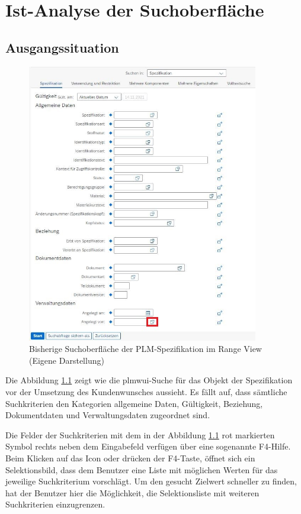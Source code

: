 \chapter{Ist-Analyse der Suchoberfläche}

\section{Ausgangssituation}

\begin{figure}[htbp]
    \centering
    \includegraphics[width=0.9\textwidth]{img/LayoutRdavormitMarkierung.jpg}
    \caption[Bisherige Suchoberfläche der PLM-Spezifikation im Range View]{Bisherige Suchoberfläche der PLM-Spezifikation im Range View (Eigene Darstellung)}
    \label{fig:LayoutRdavor}
\end{figure}

Die Abbildung \ref{fig:LayoutRdavor} zeigt wie die \ac{plmwui}-Suche für das Objekt der Spezifikation vor der Umsetzung des Kundenwunsches aussieht. Es fällt auf, dass sämtliche Suchkriterien den Kategorien allgemeine Daten, Gültigkeit, Beziehung, Dokumentdaten und Verwaltungsdaten zugeordnet sind.

Die Felder der Suchkriterien mit dem in der Abbildung \ref{fig:LayoutRdavor} rot markierten Symbol rechts neben dem Eingabefeld verfügen über eine sogenannte F4-Hilfe. Beim Klicken auf das Icon oder drücken der F4-Taste, öffnet sich ein Selektionsbild, dass dem Benutzer eine Liste mit möglichen Werten für das jeweilige Suchkriterium vorschlägt. Um den gesucht Zielwert schneller zu finden, hat der Benutzer hier die Möglichkeit, die Selektionsliste mit weiteren Suchkriterien einzugrenzen. 


